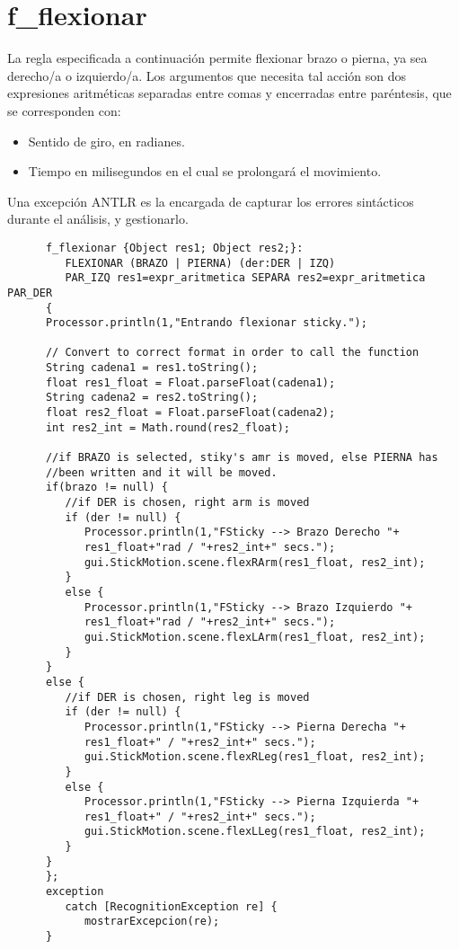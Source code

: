    \section{f\_flexionar}
   La regla especificada a continuación permite flexionar brazo o pierna, ya sea derecho/a o izquierdo/a. Los argumentos que
   necesita tal acción son dos expresiones aritméticas separadas entre comas y encerradas entre paréntesis, que se corresponden con:
   \begin{itemize}
      \item Sentido de giro, en radianes.
      \item Tiempo en milisegundos en el cual se prolongará el movimiento.
   \end{itemize}
   Una excepción ANTLR es la encargada de capturar los errores sintácticos durante el análisis, y gestionarlo.
   \begin{lstlisting}
      f_flexionar {Object res1; Object res2;}: 
         FLEXIONAR (BRAZO | PIERNA) (der:DER | IZQ) 
         PAR_IZQ res1=expr_aritmetica SEPARA res2=expr_aritmetica PAR_DER
      {
      Processor.println(1,"Entrando flexionar sticky.");
      
      // Convert to correct format in order to call the function
      String cadena1 = res1.toString(); 
      float res1_float = Float.parseFloat(cadena1);
      String cadena2 = res2.toString(); 
      float res2_float = Float.parseFloat(cadena2);
      int res2_int = Math.round(res2_float);

      //if BRAZO is selected, stiky's amr is moved, else PIERNA has 
      //been written and it will be moved.
      if(brazo != null) {
         //if DER is chosen, right arm is moved
         if (der != null) {
            Processor.println(1,"FSticky --> Brazo Derecho "+
            res1_float+"rad / "+res2_int+" secs.");
            gui.StickMotion.scene.flexRArm(res1_float, res2_int);
         }
         else {
            Processor.println(1,"FSticky --> Brazo Izquierdo "+
            res1_float+"rad / "+res2_int+" secs.");
            gui.StickMotion.scene.flexLArm(res1_float, res2_int);
         }
      }
      else {
         //if DER is chosen, right leg is moved
         if (der != null) {
            Processor.println(1,"FSticky --> Pierna Derecha "+
            res1_float+" / "+res2_int+" secs.");
            gui.StickMotion.scene.flexRLeg(res1_float, res2_int);
         }
         else {
            Processor.println(1,"FSticky --> Pierna Izquierda "+
            res1_float+" / "+res2_int+" secs.");
            gui.StickMotion.scene.flexLLeg(res1_float, res2_int);
         }
      }
      };
      exception
         catch [RecognitionException re] {
            mostrarExcepcion(re);
      }
   \end{lstlisting}

